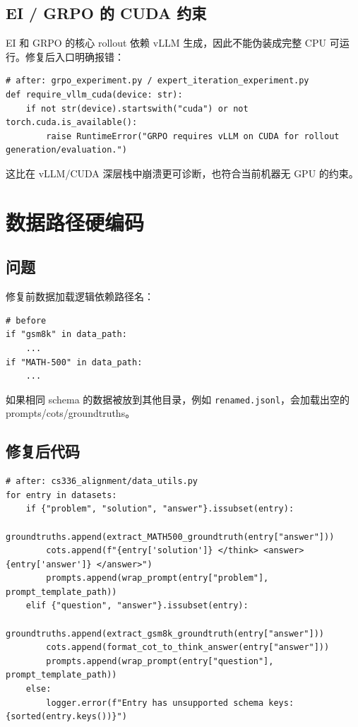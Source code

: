 \documentclass[UTF8,a4paper,11pt]{ctexart}
\begin{document}
\subsection{EI / GRPO 的 CUDA 约束}

EI 和 GRPO 的核心 rollout 依赖 vLLM 生成，因此不能伪装成完整 CPU 可运行。修复后入口明确报错：

\begin{lstlisting}
# after: grpo_experiment.py / expert_iteration_experiment.py
def require_vllm_cuda(device: str):
    if not str(device).startswith("cuda") or not torch.cuda.is_available():
        raise RuntimeError("GRPO requires vLLM on CUDA for rollout generation/evaluation.")
\end{lstlisting}

这比在 vLLM/CUDA 深层栈中崩溃更可诊断，也符合当前机器无 GPU 的约束。

\section{数据路径硬编码}

\subsection{问题}

修复前数据加载逻辑依赖路径名：

\begin{lstlisting}
# before
if "gsm8k" in data_path:
    ...
if "MATH-500" in data_path:
    ...
\end{lstlisting}

如果相同 schema 的数据被放到其他目录，例如 \texttt{renamed.jsonl}，会加载出空的 prompts/cots/groundtruths。

\subsection{修复后代码}

\begin{lstlisting}
# after: cs336_alignment/data_utils.py
for entry in datasets:
    if {"problem", "solution", "answer"}.issubset(entry):
        groundtruths.append(extract_MATH500_groundtruth(entry["answer"]))
        cots.append(f"{entry['solution']} </think> <answer> {entry['answer']} </answer>")
        prompts.append(wrap_prompt(entry["problem"], prompt_template_path))
    elif {"question", "answer"}.issubset(entry):
        groundtruths.append(extract_gsm8k_groundtruth(entry["answer"]))
        cots.append(format_cot_to_think_answer(entry["answer"]))
        prompts.append(wrap_prompt(entry["question"], prompt_template_path))
    else:
        logger.error(f"Entry has unsupported schema keys: {sorted(entry.keys())}")
\end{lstlisting}
\end{document}
